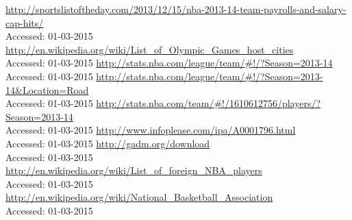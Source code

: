 \documentclass[11pt,a4paper]{article}
\begin{document}
\newpage
\begin{thebibliography}{9}
  \url{http://sportslistoftheday.com/2013/12/15/nba-2013-14-team-payrolls-and-salary-cap-hits/}\\
  {Accessed: 01-03-2015}
  \url{http://en.wikipedia.org/wiki/List_of_Olympic_Games_host_cities}\\
  {Accessed: 01-03-2015}
  \url{http://stats.nba.com/league/team/#!/?Season=2013-14}\\
  {Accessed: 01-03-2015}
  \url{http://stats.nba.com/league/team/#!/?Season=2013-14&Location=Road}\\
  {Accessed: 01-03-2015}
  \url{http://stats.nba.com/team/#!/1610612756/players/?Season=2013-14}\\
  {Accessed: 01-03-2015}
  \url{http://www.infoplease.com/ipa/A0001796.html}\\
  {Accessed: 01-03-2015}
  \url{http://gadm.org/download}\\
  {Accessed: 01-03-2015}
  \url{http://en.wikipedia.org/wiki/List_of_foreign_NBA_players}\\
  {Accessed: 01-03-2015}
  \url{http://en.wikipedia.org/wiki/National_Basketball_Association}\\
  {Accessed: 01-03-2015}
\end{thebibliography}
\end{document}
